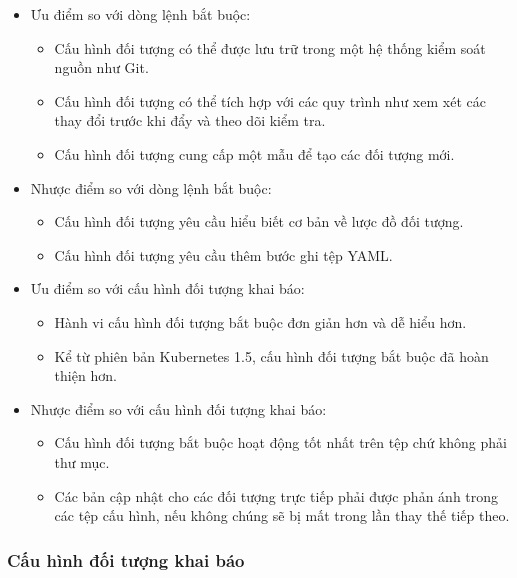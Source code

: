 \documentclass[12pt,a4paper]{report}
\begin{document}
	\begin{itemize}
		\item Ưu điểm so với dòng lệnh bắt buộc:
		\begin{itemize}
			\item Cấu hình đối tượng có thể được lưu trữ trong một hệ thống kiểm soát nguồn như Git.
			\item Cấu hình đối tượng có thể tích hợp với các quy trình như xem xét các thay đổi trước khi đẩy và theo dõi kiểm tra.
			\item Cấu hình đối tượng cung cấp một mẫu để tạo các đối tượng mới.
		\end{itemize}
		\item Nhược điểm so với dòng lệnh bắt buộc:
		\begin{itemize}
			\item Cấu hình đối tượng yêu cầu hiểu biết cơ bản về lược đồ đối tượng.
			\item Cấu hình đối tượng yêu cầu thêm bước ghi tệp YAML.
		\end{itemize}
		\item Ưu điểm so với cấu hình đối tượng khai báo:
		\begin{itemize}
			\item Hành vi cấu hình đối tượng bắt buộc đơn giản hơn và dễ hiểu hơn.
			\item Kể từ phiên bản Kubernetes 1.5, cấu hình đối tượng bắt buộc đã hoàn thiện hơn.
		\end{itemize}
		\item Nhược điểm so với cấu hình đối tượng khai báo:
		\begin{itemize}
			\item Cấu hình đối tượng bắt buộc hoạt động tốt nhất trên tệp chứ không phải thư mục.
			\item Các bản cập nhật cho các đối tượng trực tiếp phải được phản ánh trong các tệp cấu hình, nếu không chúng sẽ bị mất trong lần thay thế tiếp theo.
		\end{itemize}
	\end{itemize}
	
	\subsubsection{Cấu hình đối tượng khai báo}
	\smallskip
	
\end{document}
